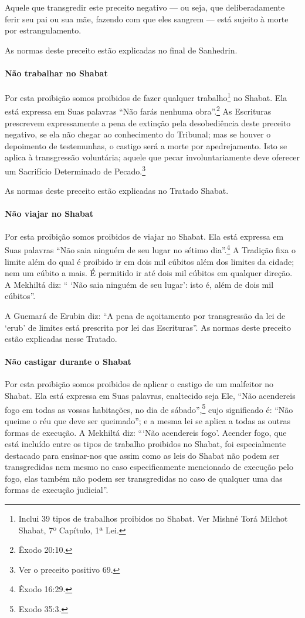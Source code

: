 Aquele que transgredir este preceito negativo --- ou seja, que deliberadamente ferir seu pai ou sua mãe, fazendo com que eles sangrem --- está sujeito à morte por estrangulamento.

As normas deste preceito estão explicadas no final de Sanhedrin.

\paragraph{Não trabalhar no Shabat}

Por esta proibição somos proibidos de fazer qualquer
trabalho\footnote{Inclui 39 tipos de trabalhos proibidos no Shabat. Ver Mishné Torá
  Milchot Shabat, 7º Capítulo, 1ª Lei.} no Shabat. Ela está expressa em Suas
palavras ``Não farás nenhuma obra''.\footnote{Êxodo 20:10.} As Escrituras
prescrevem expressamente a pena de extinção pela desobediência deste
preceito negativo, se ela não chegar ao conhecimento do Tribunal; mas se
houver o depoimento de testemunhas, o castigo será a morte por
apedrejamento. Isto se aplica à transgressão voluntária; aquele que
pecar involuntariamente deve oferecer um Sacrifício Determinado de
Pecado.\footnote{Ver o preceito positivo 69.}

As normas deste preceito estão explicadas no Tratado Shabat.

\paragraph{Não viajar no Shabat}

Por esta proibição somos proibidos de viajar no Shabat. Ela está
expressa em Suas palavras ``Não saia ninguém de seu lugar no sétimo
dia''.\footnote{Êxodo 16:29.} A Tradição fixa o limite além do qual é proibido ir
em dois mil cúbitos além dos limites da cidade; nem um cúbito a mais. É
permitido ir até dois mil cúbitos em qualquer direção. A Mekhiltá diz:
`` `Não saia ninguém de seu lugar': isto é, além de dois mil cúbitos''.

A Guemará de Erubin diz: ``A pena de açoitamento por transgressão da lei
de `erub' de limites está prescrita por lei das Escrituras''. As normas
deste preceito estão explicadas nesse Tratado.

\paragraph{Não castigar durante o Shabat}

Por esta proibição somos proibidos de aplicar o castigo de um malfeitor
no Shabat. Ela está expressa em Suas palavras, enaltecido seja Ele,
``Não acendereis fogo em todas as vossas habitações, no dia de sábado'',\footnote{Exodo 35:3.} cujo significado é: ``Não queime o réu que deve ser
queimado''; e a mesma lei se aplica a todas as outras formas de
execução. A Mekhiltá diz: ```Não acendereis fogo'. Acender fogo, que
está incluído entre os tipos de trabalho proibidos no Shabat, foi
especialmente destacado para ensinar-nos que assim como as leis do
Shabat não podem ser transgredidas nem mesmo no caso especificamente
mencionado de execução pelo fogo, elas também não podem ser
transgredidas no caso de qualquer uma das formas de execução judicial''.

